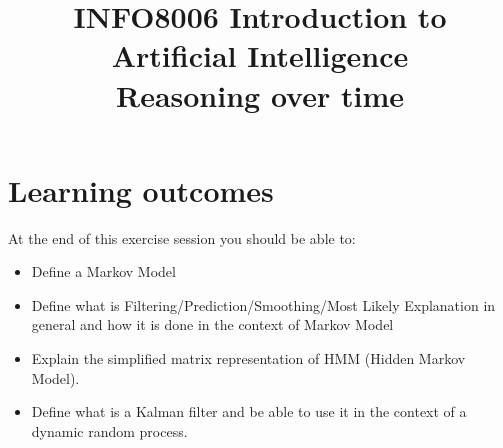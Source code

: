 \documentclass[9pt,a4paper]{extarticle}
\title{{\bf INFO8006 Introduction to Artificial Intelligence}\\[1em]
Reasoning over time}
\date{}
\begin{document}
\maketitle
\vspace{-4em}


   \setcounter{page}{1}

  \section*{Learning outcomes} 
      At the end of this exercise session you should be able to:
      \begin{itemize}
       \item Define a Markov Model
       \item Define what is Filtering/Prediction/Smoothing/Most Likely Explanation in general and how it is done in the context of Markov Model
       \item Explain the simplified matrix representation of HMM (Hidden Markov Model).
       \item Define what is a Kalman filter and be able to use it in the context of a dynamic random process.
   \end{itemize}
\end{document}

